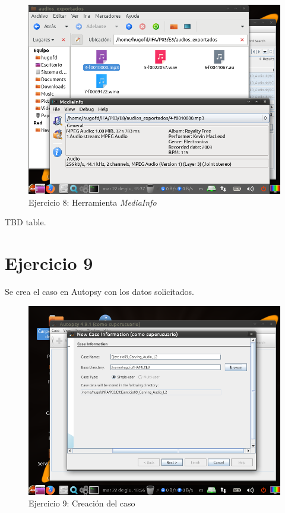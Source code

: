 \documentclass[11pt]{article}
\begin{document}
\begin{figure}[H]
    \caption{Ejercicio 8: Herramienta \textit{MediaInfo}}
    \centering
    \includegraphics[scale=0.7]{e8-6.png}
\end{figure}

TBD table.

\section{Ejercicio 9}
Se crea el caso en Autopsy con los datos solicitados.

\begin{figure}[H]
    \caption{Ejercicio 9: Creación del caso}
    \centering
    \includegraphics[scale=0.7]{e9-1.png}
\end{figure}
\end{document}
